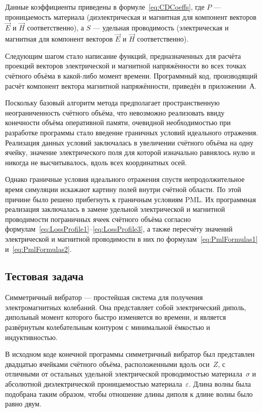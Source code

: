 Данные коэффициенты приведены в формуле~\eqref{eq:CDCoeffs}, где $ P $ --- проницаемость материала (диэлектрическая и магнитная для компонент векторов $\vec{E}$  и $\vec{H}$ соответственно), а $S$ --- удельная проводимость (электрическая и магнитная для компонент векторов $\vec{E}$  и $\vec{H}$ соответственно).

Следующим шагом стало написание функций, предназначенных для расчёта проекций векторов электрической и магнитной напряжённости во всех точках счётного объёма в какой-либо момент времени. Программный код, производящий расчёт компонент вектора магнитной напряжённости, приведён в приложении~А.

Поскольку базовый алгоритм метода предполагает пространственную неограниченность счётного объёма, что невозможно реализовать ввиду конечности объёма оперативной памяти, очевидной необходимостью при разработке программы стало введение граничных условий идеального отражения. Реализация данных условий заключалась в увеличении счётного объёма на одну ячейку, значение электрического поля для которой изначально равнялось нулю и никогда не высчитывалось, вдоль всех координатных осей.

Однако граничные условия идеального отражения спустя непродолжительное время симуляции искажают картину полей внутри счётной области. По этой причине было решено прибегнуть к граничным условиям PML. Их программная реализация заключалась в замене удельной электрической и магнитной проводимости пограничных ячеек счётного объёма согласно формулам~\eqref{eq:LossProfile1}--\eqref{eq:LossProfile3}, а также пересчёту значений электрической и магнитной проводимости в них по формулам~\eqref{eq:PmlFormulas1} и~\eqref{eq:PmlFormulas2}.

\subsection{Тестовая задача}

Симметричный вибратор --- простейшая система для получения электромагнитных колебаний. Она представляет собой электрический диполь, дипольный момент которого быстро изменяется во времени, и является развёрнутым колебательным контуром с минимальной ёмкостью и индуктивностью.

В исходном коде конечной программы симметричный вибратор был представлен двадцатью ячейками счётного объёма, расположенными вдоль оси~$ Z $, с отличными от остальных удельной электрической проводимостью материала~$\sigma$
и абсолютной диэлектрической проницаемостью материала~$\varepsilon$. Длина волны была подобрана таким образом, чтобы отношение длины диполя к длине волны было равно двум.

